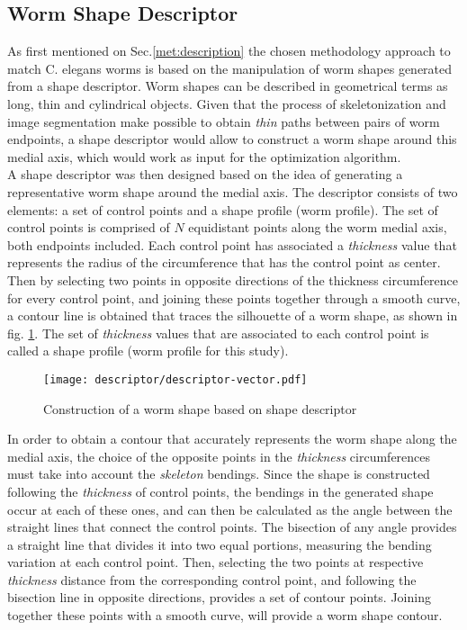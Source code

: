 \subsection{Worm Shape Descriptor}
\label{sec:metshapedescriptor}

As first mentioned on Sec.\ref{met:description} the chosen methodology approach 
to match C. elegans worms is based on the manipulation of 
worm shapes generated from a shape descriptor.
Worm shapes can be described in geometrical terms as long, thin and cylindrical 
objects. Given that the process of skeletonization and image segmentation 
make possible to obtain \emph{thin} paths between pairs of worm endpoints, 
a shape descriptor would allow to construct a worm shape around this
medial axis, which would work as input for the 
optimization algorithm. \\

A shape descriptor was then designed based on the idea of generating a representative
worm shape around the medial axis. The descriptor consists of two 
elements: a set of control points and a shape profile (worm profile). 
The set of control points is comprised of $N$ equidistant points 
along the worm medial axis, both endpoints included.
Each control point has associated a \emph{thickness} value that represents the
radius of the circumference that has the control point as center. Then by selecting two points
in opposite directions of the thickness circumference for every control point, and joining
these points together through a smooth curve, a contour line is obtained that traces
the silhouette of a worm shape, as shown in fig. \ref{fig:descriptor}. 
The set of \emph{thickness} values that are associated to each control point
is called a shape profile (worm profile for this study).

\begin{figure}[h t b p ! H]
 \centering
   \texttt{[image: descriptor/descriptor-vector.pdf]}
 \caption{Construction of a worm shape based on shape descriptor}
 \label{fig:descriptor}
\end{figure}

In order to obtain a contour that accurately represents the worm shape along the 
medial axis, the choice of the opposite points in the \emph{thickness} circumferences 
must take into account the \emph{skeleton} bendings.
Since the shape is constructed following the \emph{thickness} of control points,
the bendings in the generated shape occur at each of these ones, and can then 
be calculated as the angle between the straight lines that connect
the control points. 
The bisection of any angle provides a straight line that divides it
into two equal portions, measuring the bending variation at each control point.
Then, selecting the two points at respective \emph{thickness} distance 
from the corresponding control point, and following the bisection line in opposite directions, provides a set of contour points. Joining 
together these points with a smooth curve, will provide a worm shape contour.\\

